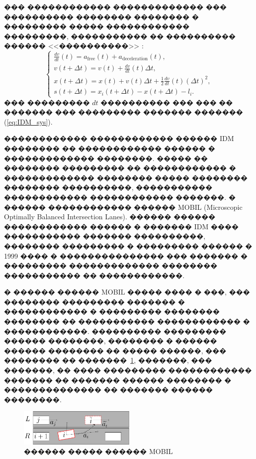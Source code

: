 \documentclass[11pt]{ubs}
\begin{document}
��� ������������ ������������� ��� ���������� �������� �����\-��� � ���������  ����� ������������ ���������, ����������� �� ���������� ������ <<����������>> {\cite{SHOOT}}:
\[
  \left\{
  \begin{array}{l}
    \displaystyle\frac{dv}{dt}(t) =  a_{\mathrm{free}}(t)+a_{\mathrm{deceleration}}(t),              \\
    \displaystyle v(t+\Delta t)    =  v(t) + \frac{dv}{dt}(t)\Delta t,                               \\
    \displaystyle x(t+\Delta t)    =  x(t)+v(t)\Delta t+ \frac{1}{2}  \frac{dv}{dt}(t) (\Delta t)^2, \\
    \displaystyle s(t+\Delta t)    =  x_i(t+\Delta t)- x(t+\Delta t)- {l}_i.
  \end{array}
  \right.
\]
���  ��������� $dt$ ���������� ��� ��� �� ������� ��� ��������� ������� ������� (\ref{eq:IDM_sys}).

  {
    ������������ ������������ ������ IDM �������� �� ������������ ������ � ������������� ��������.
    ����� �� �������� ��������� �� ������������ � ������������� �������� ����� �������� �������� ����������, ����������� ������������ ������������ �������.
    � ������ ������������ ������ MOBIL (Microscopic Optimally Balanced Intersection Lanes).  ������ ������ ������������ ������ � ������� IDM   ���� �����������  ������� ����������, �������� ��������� � ��������� ������ \cite{MOBIL} � 1999 ���� � ��������������� ��� ������� � ��������� ������������� �������� ����������� �� ������������.
  }

� ������ ������ MOBIL ����� ���� � ���, ��� �������� ��������� ������� � ������������ � ��������� �������� �������� �� ����������� ������������ � ������������.
���������� ��������� ������ ��������, �������� � ������ ������ �������� �� ����� ������, ��� �������� �� {�������~\ref{fig:MOBIL},} �������, ��� �������, �� ���� ��������� ������������ ������� �� ������� ������ �������� � �������������� �� ������� ������ ��������.

\begin{figure}[tbph]
  \centering
  \includegraphics[width = 0.5\textwidth]{mobil.pdf}
  \caption{������ ����� ������ MOBIL}\label{fig:MOBIL}
\end{figure}
\end{document}
